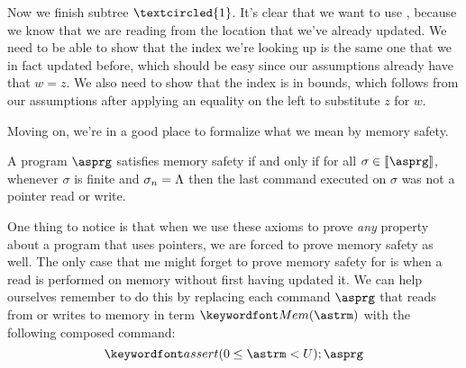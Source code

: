 \documentclass[11pt,twoside]{scrartcl}
\begin{document}
\begin{sequentdeduction}[array]
 {
}
\end{sequentdeduction}
Now we finish subtree $\textcircled{1}$.
It's clear that we want to use , because we know that we are reading from the location that we've already updated.
We need to be able to show that the index we're looking up is the same one that we in fact updated before, which should be easy since our assumptions already have that $w = z$.
We also need to show that the index is in bounds, which follows from our assumptions after applying an equality on the left to substitute $z$ for $w$.
\begin{sequentdeduction}[array]
 {
}
\end{sequentdeduction}

Moving on, we're in a good place to formalize what we mean by memory safety.

\begin{definition}
A program $\asprg$ satisfies memory safety if and only if for all $\sigma\in\llbracket\asprg\rrbracket$, whenever $\sigma$ is finite and $\sigma_n = \Lambda$ then the last command executed on $\sigma$ was not a pointer read or write. 
\end{definition}

One thing to notice is that when we use these axioms to prove \emph{any} property about a program that uses pointers, we are forced to prove memory safety as well. The only case that me might forget to prove memory safety for is when a read is performed on memory without first having updated it. We can help ourselves remember to do this by replacing each command $\asprg$ that reads from or writes to memory in term $\pderef{\astrm}$ with the following composed command:
\begin{equation}
\label{eq:memorysafe}
\passert{0 \le \astrm < \maxmem};\asprg
\end{equation}
\end{document}
